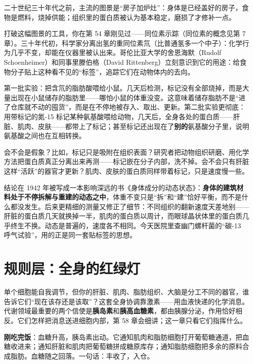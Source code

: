 \begin{zhengju}
二十世纪三十年代之前，主流的图景是“房子加炉灶”：身体是已经盖好的房子，食物是燃料，烧掉供能；组织里的蛋白质被认为基本稳定，磨损了才修补一点。

打破这幅图景的工具，你在第 54 章刚见过——同位素示踪（同位素的概念见第 7 章）。三十年代初，科学家分离出氢的重同位素氘（比普通氢多一个中子）：化学行为几乎不变，却能在仪器里被认出来。哥伦比亚大学的舍恩海默（Rudolf Schoenheimer）和同事里滕伯格（David Rittenberg）立刻意识到它的用途：给食物分子贴上这种看不见的“标签”，追踪它们在动物体内的去向。

第一批实验：把含氘的脂肪酸喂给小鼠。几天后检测，标记没有全部烧掉，而是大量出现在小鼠储存的脂肪里——哪怕小鼠的体重没变。这意味着储存脂肪不是“进了仓库就不动的囤货”，而是在不停地被存入、取出、更新。第二批实验更彻底：用带标记的氮-15 标记某种氨基酸喂给动物，几天后，全身各处的蛋白质——肝脏、肌肉、皮肤——都带上了标记；甚至标记还出现在了\textbf{别的}氨基酸分子里，说明氨基酸之间也在互相转换。

会不会是假象？比如，标记只是吸附在组织表面？研究者把动物组织研磨、用化学方法把蛋白质真正分离出来再测——标记嵌在分子内部，洗不掉。会不会只有肝脏这样“活跃”的器官才更新？肌肉、皮肤的蛋白质同样带着标记，只是速度慢一些。

结论在 1942 年被写成一本影响深远的书《身体成分的动态状态》：\textbf{身体的建筑材料处于不停拆解与重建的动态之中}，体重不变只是“拆”和“建”恰好平衡，而不是什么都没发生。后来更精细的测量又修正了细节：不同组织的翻新速度天差地别——肝脏的蛋白质几天就换掉一半，肌肉的蛋白质以周计，而眼球晶状体里的蛋白质几乎终生不换。动态是普遍的，速度各不相同。今天医院里查幽门螺杆菌的“碳-13 呼气试验”，用的正是同一套贴标签的思想。
\end{zhengju}

\section{规则层：全身的红绿灯}

单个细胞能自我调节，但你的肝脏、肌肉、脂肪组织、大脑是分工不同的器官，谁告诉它们“现在该存还是该取”？这套全身协调靠激素——用血液快递的化学消息。代谢领域最重要的两个信使是\textbf{胰岛素}和\textbf{胰高血糖素}，都由胰腺分泌，作用恰好相反。它们怎样把消息送进细胞内部，第 58 章会细讲；这一章只看它们指挥什么。

\textbf{刚吃完饭}：血糖升高，胰岛素出动。它通知肌肉和脂肪细胞打开葡萄糖通道，把血糖收进来；通知肝脏和肌肉把葡萄糖拼成糖原库存；通知脂肪细胞把多余的原料合成脂肪。血糖随之回落。一句话：丰收了，入仓。

